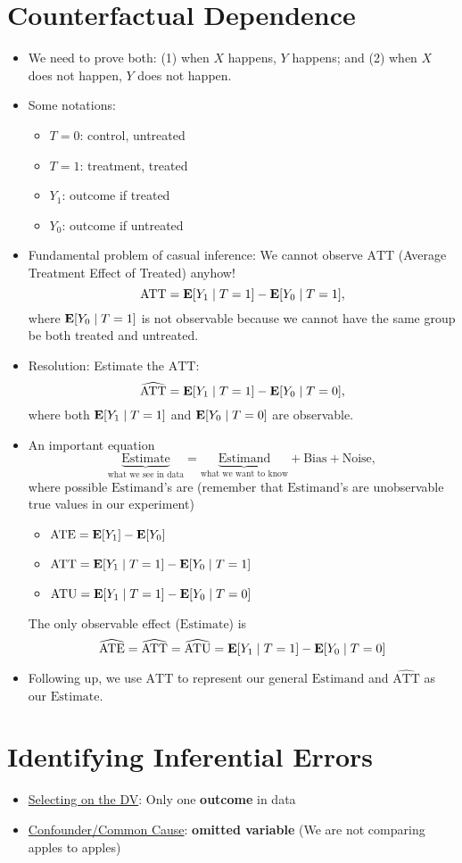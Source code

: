 \documentclass[10pt, letterpaper]{article}
\def\E{\vb E}
\def\ATT{\mathrm{ATT}}
\def\ATE{\mathrm{ATE}}
\def\ATU{\mathrm{ATU}}
\begin{document}
\begin{multicols}{2}
\section*{Counterfactual Dependence}
\begin{itemize}
	\item We need to prove both: (1) when $X$ happens, $Y$ happens; and (2) when $X$ does not happen, $Y$ does not happen. 
	\item Some notations:
	\begin{itemize}
		\item $T=0$: control, untreated
		\item $T=1$: treatment, treated
		\item $Y_1$: outcome if treated
		\item $Y_0$: outcome if untreated
	\end{itemize}
	\item Fundamental problem of casual inference: We cannot observe $\ATT$ (Average Treatment Effect of Treated) anyhow!  \[\ATT=\E\qty[Y_1\mid T=1]-\E\qty[Y_0\mid T=1],\] where $\E\qty[Y_0\mid T=1]$ is not observable because we cannot have the same group be both treated and untreated.  
	\item Resolution: Estimate the $\ATT$: \[\widehat{\ATT}=\E\qty[Y_1\mid T=1]-\E\qty[Y_0\mid T=0],\] where both $\E\qty[Y_1\mid T=1]$ and $\E\qty[Y_0\mid T=0]$ are observable.
	\item An important equation \[\underbrace{\boxed{\textrm{Estimate}}}_\text{what we see in data}=\underbrace{\boxed{\textrm{Estimand}}}_\text{what we want to know}+\textrm{Bias}+\textrm{Noise},\] where possible $\mathrm{Estimand}$'s are (remember that $\mathrm{Estimand}$'s are unobservable true values in our experiment)
	\begin{itemize}
		\item $\ATE=\E[Y_1]-\E[Y_0]$
		\item $\ATT=\E\qty[Y_1\mid T=1]-\E\qty[Y_0\mid T=1]$
		\item $\ATU=\E\qty[Y_1\mid T=1]-\E\qty[Y_0\mid T=0]$
	\end{itemize}
	The only observable effect ($\mathrm{Estimate}$) is \[\widehat{\ATE}=\widehat{\ATT}=\widehat{\ATU}=\E\qty[Y_1\mid T=1]-\E\qty[Y_0\mid T=0]\]
	\item Following up, we use $\ATT$ to represent our general $\mathrm{Estimand}$ and $\widehat{\ATT}$ as our $\mathrm{Estimate}$.
\end{itemize}

\section*{Identifying Inferential Errors}
\begin{itemize}
	\item \underline{Selecting on the DV}: Only one \textbf{outcome} in data
	\item \underline{Confounder/Common Cause}: \textbf{omitted variable} (We are not comparing apples to apples)
\end{itemize}


\end{multicols}
\end{document}
